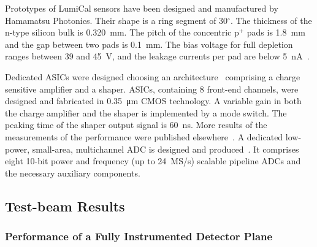 Prototypes of LumiCal sensors have been designed
and manufactured by Hamamatsu
Photonics.
Their shape is a ring segment of 30$^\circ$.
The thickness of the n-type silicon bulk is \SI{0.320}{mm}.
The pitch of the concentric $\text{p}^+$ pads is \SI{1.8}{mm} and
the gap between two pads is \SI{0.1}{mm}.
The bias voltage for full depletion ranges between 39 and \SI{45}{V},
and the leakage currents per pad are below \SI{5}{nA}~\cite{eudet2009}.

Dedicated ASICs were designed choosing
an
architecture~\cite{Boie1982365,Gatti:1986qq}
comprising a charge sensitive amplifier and a shaper.
ASICs, containing 8 front-end channels, were designed and fabricated in \SI{0.35}{\micro\meter} CMOS technology.
A variable gain in both the charge amplifier and
the shaper is implemented by a mode switch. The peaking time of the shaper output signal is \SI{60}{ns}.
More results of the measurements of the performance were published elsewhere~\cite{4600902}.
A dedicated low-power, small-area, multichannel ADC is designed and produced~\cite{6156491}.
It comprises eight 10-bit power and frequency (up to \SI{24}{MS/s}) scalable pipeline ADCs and the necessary
auxiliary components.


\subsection{Test-beam Results}

\subsubsection{Performance of a Fully Instrumented  Detector Plane}

